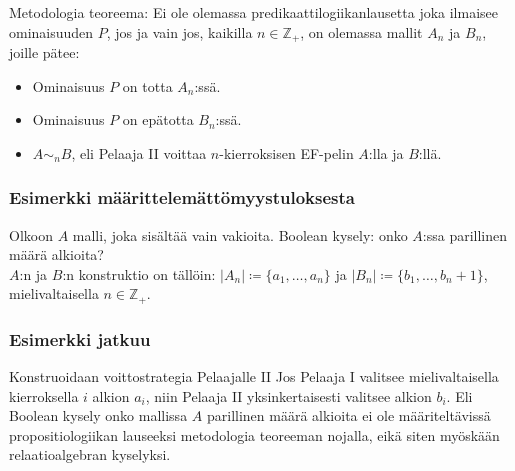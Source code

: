 \documentclass{beamer}
\begin{document}
\begin{frame}
Metodologia teoreema: Ei ole olemassa predikaattilogiikanlausetta joka ilmaisee ominaisuuden $P$, jos ja vain jos, kaikilla $n \in \mathbb{Z}_+$, on olemassa mallit $A_n$ ja $B_n$, joille pätee:
\begin{itemize}
\item<2-> Ominaisuus $P$ on totta $A_n$:ssä.
\item<3-> Ominaisuus $P$ on epätotta $B_n$:ssä.
\item<4-> $A \sim_n B$, eli Pelaaja II voittaa $n$-kierroksisen EF-pelin $A$:lla ja $B$:llä.
\end{itemize}
\end{frame}

\begin{frame}
\frametitle{Esimerkki määrittelemättömyystuloksesta}
Olkoon $A$ malli, joka sisältää vain vakioita. \pause Boolean kysely: onko $A$:ssa parillinen määrä alkioita? \pause \\ $A$:n ja $B$:n konstruktio on tällöin: $|A_n| \coloneqq \{a_1, \ldots, a_n\}$ ja $|B_n| \coloneqq \{b_1, \ldots, b_n+1\}$, mielivaltaisella $n \in \mathbb{Z}_+$.
\end{frame}

\begin{frame}
\frametitle{Esimerkki jatkuu}
Konstruoidaan voittostrategia Pelaajalle II \pause Jos Pelaaja I valitsee mielivaltaisella kierroksella $i$ alkion $a_i$, niin Pelaaja II yksinkertaisesti valitsee alkion $b_i$. \pause Eli Boolean kysely onko mallissa $A$ parillinen määrä alkioita ei ole määriteltävissä propositiologiikan lauseeksi metodologia teoreeman nojalla, eikä siten myöskään relaatioalgebran kyselyksi.
\end{frame}
\end{document}
